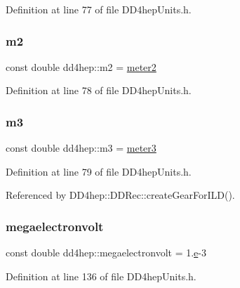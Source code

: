 Definition at line 77 of file D\+D4hep\+Units.\+h.

\hypertarget{namespacedd4hep_aea4ab60384218f15ec3ba53896735b6c}{}\label{namespacedd4hep_aea4ab60384218f15ec3ba53896735b6c} 
\subsubsection{\texorpdfstring{m2}{m2}}
{\footnotesize\ttfamily const double dd4hep\+::m2 = \hyperlink{namespacedd4hep_afe718b0d811af6b4d45c556e3a0e87a3}{meter2}\hspace{0.3cm}{\ttfamily [static]}}



Definition at line 78 of file D\+D4hep\+Units.\+h.

\hypertarget{namespacedd4hep_a9e16f264f9812fefbe417d510185205b}{}\label{namespacedd4hep_a9e16f264f9812fefbe417d510185205b} 
\subsubsection{\texorpdfstring{m3}{m3}}
{\footnotesize\ttfamily const double dd4hep\+::m3 = \hyperlink{namespacedd4hep_a4f771b88b1ff2018c0dacd3a1b56023b}{meter3}\hspace{0.3cm}{\ttfamily [static]}}



Definition at line 79 of file D\+D4hep\+Units.\+h.



Referenced by D\+D4hep\+::\+D\+D\+Rec\+::create\+Gear\+For\+I\+L\+D().

\hypertarget{namespacedd4hep_a4e39beba039f7a6bda24a7031c121b2a}{}\label{namespacedd4hep_a4e39beba039f7a6bda24a7031c121b2a} 
\subsubsection{\texorpdfstring{megaelectronvolt}{megaelectronvolt}}
{\footnotesize\ttfamily const double dd4hep\+::megaelectronvolt = 1.\hyperlink{_volumes_8cpp_a8a9a1f93e9b09afccaec215310e64142}{e}-\/3\hspace{0.3cm}{\ttfamily [static]}}



Definition at line 136 of file D\+D4hep\+Units.\+h.

